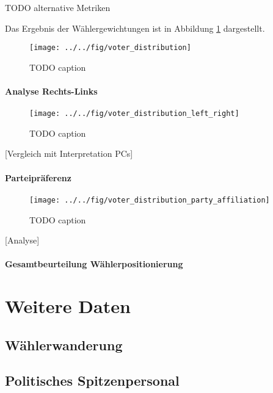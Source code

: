 TODO alternative Metriken

Das Ergebnis der Wählergewichtungen ist in Abbildung \ref{fig:voter-positions-pca} dargestellt.

\begin{figure}[htb]
	\centering
	\texttt{[image: ../../fig/voter\_distribution]}
	\caption{TODO caption}
	\label{fig:voter-positions-pca}
\end{figure}

\paragraph{Analyse Rechts-Links}
\begin{figure}[htb]
	\centering
	\texttt{[image: ../../fig/voter\_distribution\_left\_right]}
	\caption{TODO caption}
	\label{fig:voter-positions-pca-left-right}
\end{figure}
[Vergleich mit Interpretation PCs]

\paragraph{Parteipräferenz}
\begin{figure}[htb]
	\centering
	\texttt{[image: ../../fig/voter\_distribution\_party\_affiliation]}
	\caption{TODO caption}
	\label{fig:voter-positions-pca-party-affiliation}
\end{figure}
[Analyse]

\paragraph{Gesamtbeurteilung Wählerpositionierung}


\section{Weitere Daten}\label{Sec-Weitere-Daten}

\subsection{Wählerwanderung}\label{Sec-Wählerwanderung}

\subsection{Politisches Spitzenpersonal}\label{Sec-Spitzenpersonal}
